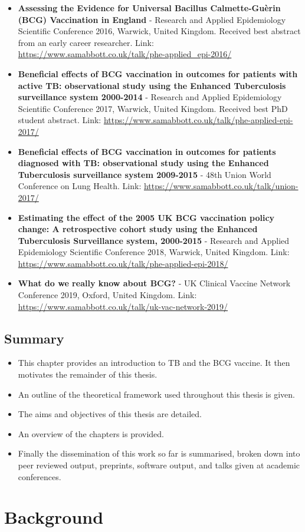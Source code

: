 \documentclass[11pt,twoside]{bristolthesis}
\providecommand{\tightlist}{%
  \setlength{\itemsep}{0pt}\setlength{\parskip}{0pt}}
\begin{document}
  \begin{itemize}
  \item
    \textbf{Assessing the Evidence for Universal Bacillus Calmette-Guèrin (BCG) Vaccination in England} - Research and Applied Epidemiology Scientific Conference 2016, Warwick, United Kingdom. Received best abstract from an early career researcher. Link: \url{https://www.samabbott.co.uk/talk/phe-applied_epi-2016/}
  \item
    \textbf{Beneficial effects of BCG vaccination in outcomes for patients with active TB: observational study using the Enhanced Tuberculosis surveillance system 2000-2014} - Research and Applied Epidemiology Scientific Conference 2017, Warwick, United Kingdom. Received best PhD student abstract. Link: \url{https://www.samabbott.co.uk/talk/phe-applied-epi-2017/}
  \item
    \textbf{Beneficial effects of BCG vaccination in outcomes for patients diagnosed with TB: observational study using the Enhanced Tuberculosis surveillance system 2009-2015} - 48th Union World Conference on Lung Health. Link: \url{https://www.samabbott.co.uk/talk/union-2017/}
  \item
    \textbf{Estimating the effect of the 2005 UK BCG vaccination policy change: A retrospective cohort study using the Enhanced Tuberculosis Surveillance system, 2000-2015} - Research and Applied Epidemiology Scientific Conference 2018, Warwick, United Kingdom. Link: \url{https://www.samabbott.co.uk/talk/phe-applied-epi-2018/}
  \item
    \textbf{What do we really know about BCG?} - UK Clinical Vaccine Network Conference 2019, Oxford, United Kingdom. Link: \url{https://www.samabbott.co.uk/talk/uk-vac-network-2019/}
  \end{itemize}
  \hypertarget{summary}{%
  \section{Summary}\label{summary}}
  \begin{itemize}
  \tightlist
  \item
    This chapter provides an introduction to TB and the BCG vaccine. It then motivates the remainder of this thesis.
  \item
    An outline of the theoretical framework used throughout this thesis is given.
  \item
    The aims and objectives of this thesis are detailed.
  \item
    An overview of the chapters is provided.
  \item
    Finally the dissemination of this work so far is summarised, broken down into peer reviewed output, preprints, software output, and talks given at academic conferences.
  \end{itemize}
  \hypertarget{background}{%
  \chapter{Background}\label{background}}
  
\end{document}
